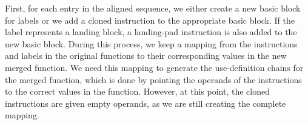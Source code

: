 %
%
%
%

First, for each entry in the aligned sequence, we either create a new basic
block for labels or we add a cloned instruction to the appropriate basic
block.
If the label represents a landing block, a landing-pad instruction is also added
to the new basic block.
During this process, we keep a mapping from the instructions and labels in the
original functions to their corresponding values in the new merged function.
We need this mapping to generate the use-definition chains for the merged function, which is done by pointing the operands of the
instructions to the correct values in the function.
However, at this point, the cloned instructions are given empty operands,
as we are still creating the complete mapping.

